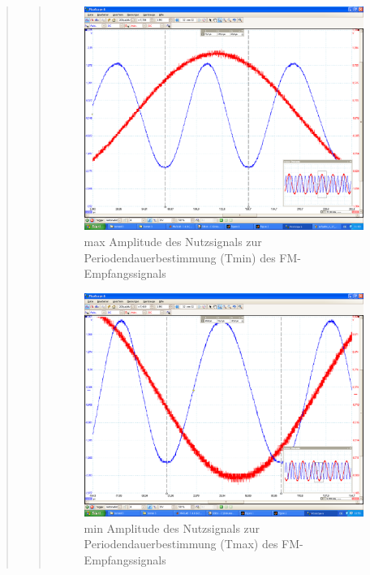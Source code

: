 \begin{quote}
\begin{quote}
                    \begin{figure}[H]
                        \label{fig:}                    
                        \includegraphics[scale=0.2, trim = 0cm 1.5cm 0cm
                        2.5cm, clip]{./Bilder/aufgabe_4_12_sinus_high-ampl}
                        \caption{max Amplitude des Nutzsignals zur
                        Periodendauerbestimmung (Tmin) des FM-Empfangssignals}
                    \end{figure}

                     \begin{figure}[H]
                        \label{fig:}
                        \includegraphics[scale=0.2, trim = 0cm 1.5cm 0cm
                        2.5cm, clip]{./Bilder/aufgabe_4_12_sinus_low-ampl}
                        \caption{min Amplitude des Nutzsignals zur
                        Periodendauerbestimmung (Tmax) des FM-Empfangssignals}
                    \end{figure}
                   \vspace{-1.5em}
        

\end{quote}
\end{quote}
